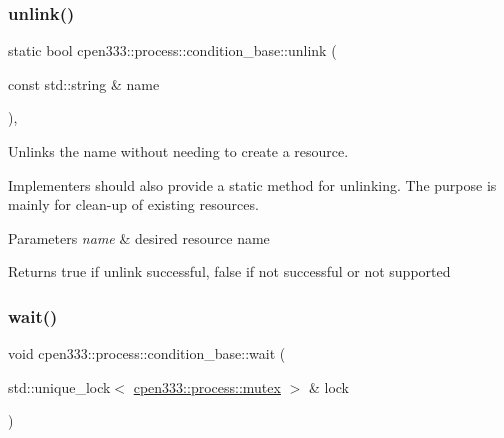 \mbox{\label{classcpen333_1_1process_1_1condition__base_a01ed2d247732584166613527ea8e1aff}} 
\subsubsection{\texorpdfstring{unlink()}{unlink()}\hspace{0.1cm}{\footnotesize\ttfamily [2/2]}}
{\footnotesize\ttfamily static bool cpen333\+::process\+::condition\+\_\+base\+::unlink (\begin{DoxyParamCaption}\item[{const std\+::string \&}]{name }\end{DoxyParamCaption})\hspace{0.3cm}{\ttfamily [inline]}, {\ttfamily [static]}}



Unlinks the name without needing to create a resource. 

Implementers should also provide a static method for unlinking. The purpose is mainly for clean-\/up of existing resources.


\begin{DoxyParams}{Parameters}
{\em name} & desired resource name \\
\hline
\end{DoxyParams}
\begin{DoxyReturn}{Returns}
{\ttfamily true} if unlink successful, {\ttfamily false} if not successful or not supported 
\end{DoxyReturn}
\mbox{\label{classcpen333_1_1process_1_1condition__base_a29b67e4579cef831f709ea4c3a32ffe5}} 
\subsubsection{\texorpdfstring{wait()}{wait()}\hspace{0.1cm}{\footnotesize\ttfamily [1/2]}}
{\footnotesize\ttfamily void cpen333\+::process\+::condition\+\_\+base\+::wait (\begin{DoxyParamCaption}\item[{std\+::unique\+\_\+lock$<$ \hyperlink{classcpen333_1_1process_1_1mutex}{cpen333\+::process\+::mutex} $>$ \&}]{lock }\end{DoxyParamCaption})\hspace{0.3cm}{\ttfamily [inline]}}



